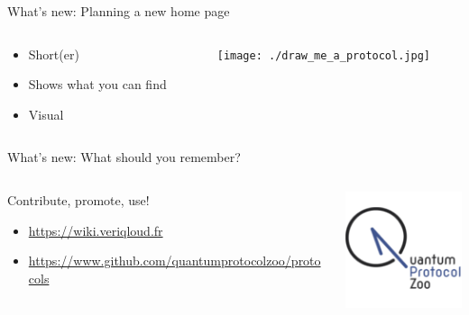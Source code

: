 \documentclass[presentation]{beamer}
\begin{document}
\begin{frame}[label={sec:org25bf850}]{What's new: Planning a new home page}
\begin{columns}
\begin{column}{.4\columnwidth}
\begin{itemize}
\item Short(er)
\item Shows what you can find
\item Visual
\end{itemize}
\end{column}
\begin{column}{.6\columnwidth}
\begin{center}
\texttt{[image: ./draw\_me\_a\_protocol.jpg]}
\end{center}
\end{column}
\end{columns}
\end{frame}
\begin{frame}[label={sec:orge963a3e}]{What's new: What should you remember?}
\begin{columns}
\begin{column}{.6\columnwidth}
Contribute, promote, use!
\begin{itemize}
\item \url{https://wiki.veriqloud.fr}
\item \url{https://www.github.com/quantumprotocolzoo/protocols}
\end{itemize}
\end{column}
\begin{column}{.4\columnwidth}
\begin{center}
\includegraphics[width=.9\linewidth]{./figs/wiki_logo.png}
\end{center}
\end{column}
\end{columns}
\end{frame}
\end{document}
